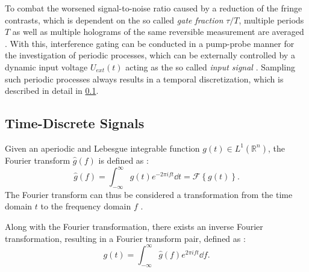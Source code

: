 To combat the worsened signal-to-noise ratio caused by a reduction of the fringe contrasts, which is dependent on the so called \emph{gate fraction} $\tau / T$, multiple periods $T$ as well as multiple holograms of the same reversible measurement are averaged \cite{Niermann2017,Wagner2019}. With this, interference gating can be conducted in a pump-probe manner \cite{Mueller2014,Bothschafter2009} for the investigation of periodic processes, which can be externally controlled by a dynamic input voltage $U_{ext}\left(t\right)$ acting as the so called \emph{input signal} \cite{Niermann2017,Wagner2019}. Sampling such periodic processes always results in a temporal discretization, which is described in detail in \cref{ssec:discrete-signals}.
\newpage
\subsection{Time-Discrete Signals} \label{ssec:discrete-signals}
Given an aperiodic and Lebesgue integrable function $g\left(t\right) \in L^1\left(\mathbb{R}^n\right)$, the Fourier transform $\hat{g}\left(f\right)$ is defined as \cite{rahman2011,kaiser2011}:
\begin{equation}
	\hat{g}\left(f\right) = \int_{-\infty}^{\infty} g\left(t\right) e^{-2\pi i f t} \dd{t} = \mathcal{F}\left\{g\left(t\right)\right\}.
\end{equation}
The Fourier transform can thus be considered a transformation from the time domain $t$ to the frequency domain $f$ \cite{rahman2011,kaiser2011}.

Along with the Fourier transformation, there exists an inverse Fourier transformation, resulting in a Fourier transform pair, defined as \cite{rahman2011,kaiser2011}:
\begin{equation}
	g\left(t\right) = \int_{-\infty}^{\infty} \hat{g}\left(f\right) e^{2\pi i f t} \dd{f}.
\end{equation}

